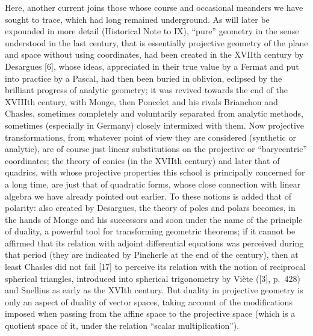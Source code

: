 Here, another current joins those whose course and occasional meanders we have sought to trace, which had long remained underground. As will later be expounded in more detail (Historical Note to IX), ``pure'' geometry in the sense understood in the last century, that is essentially projective geometry of the plane and space without using coordinates, had been created in the XVIIth century by Desargues {[}6{]}, whose ideas, appreciated in their true value by a Fermat and put into practice by a Pascal, had then been buried in oblivion, eclipsed by the brilliant progress of analytic geometry; it was revived towards the end of the XVIIIth century, with Monge, then Poncelet and his rivals Brianchon and Chasles, sometimes completely and voluntarily separated from analytic methods, sometimes (especially in Germany) closely intermixed with them. Now projective transformations, from whatever point of view they are considered (synthetic or analytic), are of course just linear substitutions on the projective or ``barycentric'' coordinates; the theory of conics (in the XVIIth century) and later that of quadrics, with whose projective properties this school is principally concerned for a long time, are just that of quadratic forms, whose close connection with linear algebra we have already pointed out earlier. To these notions is added that of polarity: also created by Desargues, the theory of poles and polars becomes, in the hands of Monge and his successors and soon under the name of the principle of duality, a powerful tool for transforming geometric theorems; if it cannot be affirmed that its relation with adjoint differential equations was perceived during that period (they are indicated by Pincherle at the end of the century), then at least Chasles did not fail {[}17{]} to perceive its relation with the notion of reciprocal spherical triangles, introduced into spherical trigonometry by Viète ({[}3{]}, p.~428) and Snellius as early as the XVIth century. But duality in projective geometry is only an aspect of duality of vector spaces, taking account of the modifications imposed when passing from the affine space to the projective space (which is a quotient space of it, under the relation ``scalar multiplication'').

